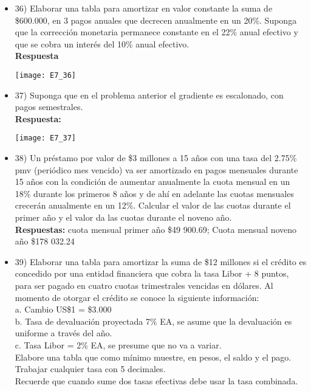 \begin{itemize}
	\item 36) Elaborar una tabla para amortizar en valor constante la suma de \$600.000, en 3 pagos anuales que decrecen anualmente en un 20\%. Suponga que la corrección monetaria permanece constante en el 22\% anual  efectivo y que se cobra un interés del 10\% anual  efectivo. \\
	\textbf{Respuesta}
	\begin{center}
		\texttt{[image: E7\_36]}
	\end{center}
	\medskip
	
	\item  37) Suponga que en el problema anterior el gradiente es escalonado, con pagos semestrales.\\
	
	\textbf{ Respuesta:}
	\begin{center}
		\texttt{[image: E7\_37]}
	\end{center}
	\medskip
	
	\item 38)  Un préstamo por valor de \$3 millones a 15 años con una tasa del 2.75\% pmv (periódico mes vencido) va ser amortizado en pagos mensuales durante 15 años con la condición de aumentar anualmente la cuota mensual en un 18\% durante los primeros 8 años y de ahí en adelante las cuotas mensuales crecerán anualmente en un 12\%. Calcular el valor de las cuotas durante el primer año y el valor da las cuotas durante el noveno año. \\
	\textbf{Respuestas:} cuota mensual primer año \$49 900.69; 
	Cuota mensual noveno año \$178 032.24
	\medskip
	
	\item 39)  Elaborar una tabla para amortizar la suma de \$12 millones si el crédito es concedido por una entidad financiera que cobra la tasa Libor + 8 puntos, para ser pagado en cuatro cuotas trimestrales vencidas en dólares. Al momento de otorgar el crédito se conoce la siguiente información: \\
	
	a.	Cambio US\$1 = \$3.000 \\
	b.	Tasa de devaluación proyectada 7\% EA, se asume que la devaluación es uniforme a través del año. \\
	c.	Tasa Libor = 2\% EA, se presume que no va a variar. \\
	
	Elabore una tabla que como mínimo muestre, en pesos, el saldo y el pago. Trabajar cualquier tasa con 5 decimales.\\ 
	Recuerde que cuando sume dos tasas efectivas debe usar la tasa    combinada.\\
	

\end{itemize}
